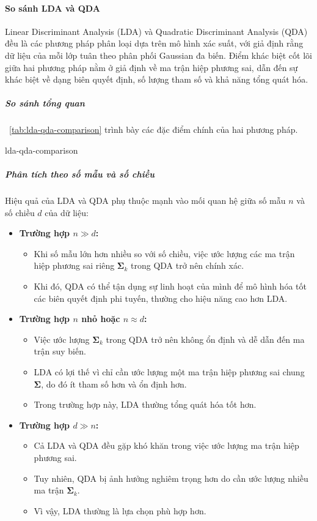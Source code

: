 \paragraph{So sánh LDA và QDA}

Linear Discriminant Analysis (LDA) và Quadratic Discriminant Analysis (QDA)
đều là các phương pháp phân loại dựa trên mô hình xác suất, với giả định rằng
dữ liệu của mỗi lớp tuân theo phân phối Gaussian đa biến. Điểm khác biệt cốt
lõi giữa hai phương pháp nằm ở giả định về ma trận hiệp phương sai, dẫn đến sự
khác biệt về dạng biên quyết định, số lượng tham số và khả năng tổng quát hóa.

\subparagraph{So sánh tổng quan}

\tablename~\ref{tab:lda-qda-comparison} trình bày các đặc điểm chính của hai
phương pháp.

\begin{table}[htbp]
  \centering
  \caption{So sánh giữa LDA và QDA}
  \label{tab:lda-qda-comparison}
  {lda-qda-comparison}
\end{table}

\subparagraph{Phân tích theo số mẫu và số chiều}
Hiệu quả của LDA và QDA phụ thuộc mạnh vào mối quan hệ giữa số mẫu $n$ và số
chiều $d$ của dữ liệu:

\begin{itemize}
  \item \textbf{Trường hợp $n \gg d$:}
  \begin{itemize}
    \item Khi số mẫu lớn hơn nhiều so với số chiều, việc ước lượng các ma trận
    hiệp phương sai riêng $\boldsymbol{\Sigma}_k$ trong QDA trở nên chính xác.
    \item Khi đó, QDA có thể tận dụng sự linh hoạt của mình để mô hình hóa tốt
    các biên quyết định phi tuyến, thường cho hiệu năng cao hơn LDA.
  \end{itemize}

  \item \textbf{Trường hợp $n$ nhỏ hoặc $n \approx d$:}
  \begin{itemize}
    \item Việc ước lượng $\boldsymbol{\Sigma}_k$ trong QDA trở nên không ổn
    định và dễ dẫn đến ma trận suy biến.
    \item LDA có lợi thế vì chỉ cần ước lượng một ma trận hiệp phương sai
    chung $\boldsymbol{\Sigma}$, do đó ít tham số hơn và ổn định hơn.
    \item Trong trường hợp này, LDA thường tổng quát hóa tốt hơn.
  \end{itemize}

  \item \textbf{Trường hợp $d \gg n$:}
  \begin{itemize}
    \item Cả LDA và QDA đều gặp khó khăn trong việc ước lượng ma trận hiệp
    phương sai.
    \item Tuy nhiên, QDA bị ảnh hưởng nghiêm trọng hơn do cần ước lượng nhiều
    ma trận $\boldsymbol{\Sigma}_k$.
    \item Vì vậy, LDA thường là lựa chọn phù hợp hơn.
  \end{itemize}
\end{itemize}


